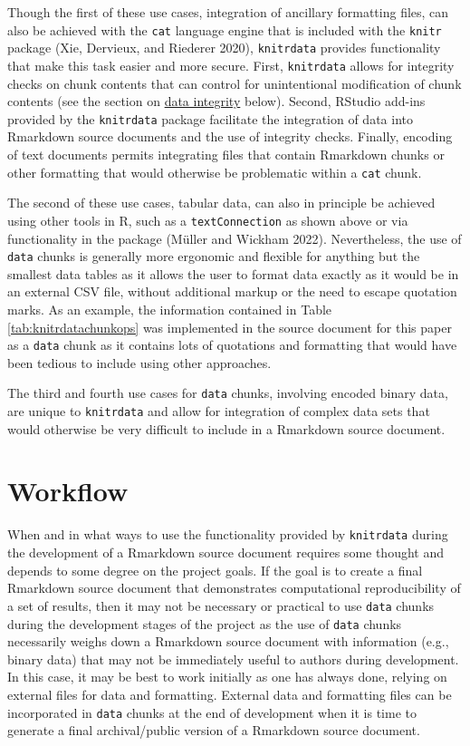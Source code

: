 Though the first of these use cases, integration of ancillary formatting files, can also be achieved with the \texttt{cat} language engine that is included with the \texttt{knitr} package (Xie, Dervieux, and Riederer 2020), \texttt{knitrdata} provides functionality that make this task easier and more secure. First, \texttt{knitrdata} allows for integrity checks on chunk contents that can control for unintentional modification of chunk contents (see the section on \protect\hyperlink{integrity}{data integrity} below). Second, RStudio add-ins provided by the \texttt{knitrdata} package facilitate the integration of data into Rmarkdown source documents and the use of integrity checks. Finally, encoding of text documents permits integrating files that contain Rmarkdown chunks or other formatting that would otherwise be problematic within a \texttt{cat} chunk.

The second of these use cases, tabular data, can also in principle be achieved using other tools in R, such as a \texttt{textConnection} as shown above or via functionality in the  package (Müller and Wickham 2022). Nevertheless, the use of \texttt{data} chunks is generally more ergonomic and flexible for anything but the smallest data tables as it allows the user to format data exactly as it would be in an external CSV file, without additional markup or the need to escape quotation marks. As an example, the information contained in Table \ref{tab:knitrdatachunkops} was implemented in the source document for this paper as a \texttt{data} chunk as it contains lots of quotations and formatting that would have been tedious to include using other approaches.

The third and fourth use cases for \texttt{data} chunks, involving encoded binary data, are unique to \texttt{knitrdata} and allow for integration of complex data sets that would otherwise be very difficult to include in a Rmarkdown source document.

\hypertarget{workflow}{%
\section{Workflow}\label{workflow}}

When and in what ways to use the functionality provided by \texttt{knitrdata} during the development of a Rmarkdown source document requires some thought and depends to some degree on the project goals. If the goal is to create a final Rmarkdown source document that demonstrates computational reproducibility of a set of results, then it may not be necessary or practical to use \texttt{data} chunks during the development stages of the project as the use of \texttt{data} chunks necessarily weighs down a Rmarkdown source document with information (e.g., binary data) that may not be immediately useful to authors during development. In this case, it may be best to work initially as one has always done, relying on external files for data and formatting. External data and formatting files can be incorporated in \texttt{data} chunks at the end of development when it is time to generate a final archival/public version of a Rmarkdown source document.

